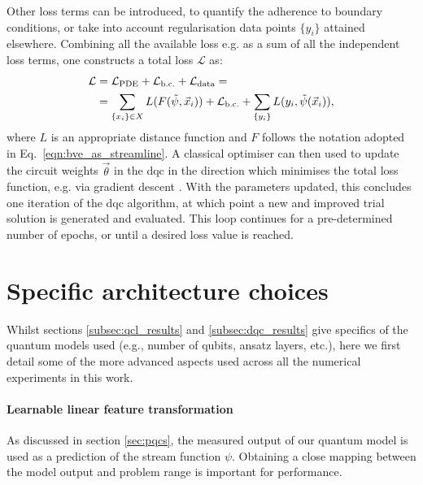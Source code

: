 \documentclass[aps,pra,a4paper,twocolumn,longbibliography,groupedaddress]{revtex4-2}
\begin{document}
Other loss terms can be introduced, to quantify the adherence to boundary conditions, or take into account regularisation data points $\{y_i\}$ attained elsewhere. 
Combining all the available loss e.g. as a sum of all the independent loss terms, one constructs a total loss $\mathcal{L}$ \cite{raissi2017physics} as:
%
\begin{align}
    \label{eq:generic_loss}
    \mathcal{L} &= \mathcal{L}_{\text{PDE}} + \mathcal{L}_{\text{b.c.}} + \mathcal{L}_{\text{data}} = \nonumber \\
    &= \sum_{\{x_i\} \in X} L(F(\Tilde{\psi}, \Vec{x}_i)) +  \mathcal{L}_{\text{b.c.}} + 
    \sum_{\{y_i\}} L(y_i, \Tilde{\psi}(\Vec{x}_i)),
\end{align}
%
where $L$ is an appropriate distance function and $F$ follows the notation adopted in Eq.~\eqref{eqn:bve_as_streamline}.
A classical optimiser can then used to update the circuit weights $\Vec{\theta}$ in the \gls{dqc} in the direction which minimises the total loss function, e.g. via gradient descent \cite{kyriienko2021generalized}. 
With the parameters updated, this concludes one iteration of the \gls{dqc} algorithm, at which point a new and improved trial solution is generated and evaluated. This loop continues for a pre-determined number of epochs, or until a desired loss value is reached.

\section{Specific architecture choices}\label{sec:specific_model_features}

Whilst sections \ref{subsec:qcl_results} and \ref{subsec:dqc_results} give specifics of the quantum models used (e.g., number of qubits, ansatz layers, etc.), here we first detail some of the more advanced aspects used across all the numerical experiments in this work.
\\

\paragraph{Learnable linear feature transformation}
As discussed in section \ref{sec:pqcs}, the measured output of our quantum model is used as a prediction of the stream function $\psi$. Obtaining a close mapping between the model output and problem range is important for performance.
\end{document}
